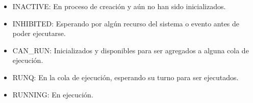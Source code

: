 \begin{itemize}
    \item \uppercase{inactive}: En proceso de creación y aún no han sido inicializados.
    \item \uppercase{inhibited}: Esperando por algún recurso del sistema o evento antes de poder ejecutarse.
    \item \uppercase{can\_run}: Inicializados y disponibles para ser agregados a alguna cola de ejecución.
    \item \uppercase{runq}: En la cola de ejecución, esperando su turno para ser ejecutados.
    \item \uppercase{running}: En ejecución.
\end{itemize}
